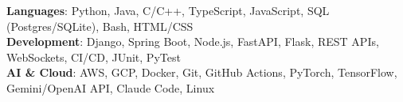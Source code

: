 \begin{itemize}[leftmargin=0.15in, label={}]
    \small{\item{
     \textbf{Languages}{: Python, Java, C/C++, TypeScript, JavaScript, SQL (Postgres/SQLite), Bash, HTML/CSS} \\
     \textbf{Development}{: Django, Spring Boot, Node.js, FastAPI, Flask, REST APIs, WebSockets, CI/CD, JUnit, PyTest} \\
     \textbf{AI \& Cloud}{: AWS, GCP, Docker, Git, GitHub Actions, PyTorch, TensorFlow, Gemini/OpenAI API, Claude Code, Linux}
    }}
\end{itemize}
